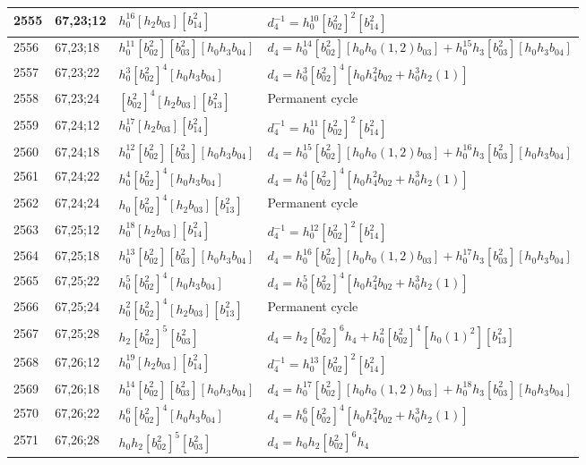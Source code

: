 \documentclass{article}
\begin{document}
\begin{longtable}{|l|l|>{\raggedright\arraybackslash}p{6cm}|>{\raggedright\arraybackslash}p{6cm}|}
\hline
2555 & 67,23;12 & $h_0^{16}[h_2b_{03}][b_{14}^2]$ & $d_{4}^{-1}=h_0^{10}[b_{02}^2]^2[b_{14}^2]$\\
\hline
2556 & 67,23;18 & $h_0^{11}[b_{02}^2][b_{03}^2][h_0h_3b_{04}]$ &$d_{4}=h_0^{14}[b_{02}^2][h_0h_0(1, 2)b_{03}] + h_0^{15}h_3[b_{03}^2][h_0h_3b_{04}]$\\
\hline
2557 & 67,23;22 & $h_0^3[b_{02}^2]^4[h_0h_3b_{04}]$ &$d_{4}=h_0^3[b_{02}^2]^4[h_0h_4^2b_{02} + h_0^3h_2(1)]$\\
\hline
2558 & 67,23;24 & $[b_{02}^2]^4[h_2b_{03}][b_{13}^2]$ & Permanent cycle\\
\hline
2559 & 67,24;12 & $h_0^{17}[h_2b_{03}][b_{14}^2]$ & $d_{4}^{-1}=h_0^{11}[b_{02}^2]^2[b_{14}^2]$\\
\hline
2560 & 67,24;18 & $h_0^{12}[b_{02}^2][b_{03}^2][h_0h_3b_{04}]$ &$d_{4}=h_0^{15}[b_{02}^2][h_0h_0(1, 2)b_{03}] + h_0^{16}h_3[b_{03}^2][h_0h_3b_{04}]$\\
\hline
2561 & 67,24;22 & $h_0^4[b_{02}^2]^4[h_0h_3b_{04}]$ &$d_{4}=h_0^4[b_{02}^2]^4[h_0h_4^2b_{02} + h_0^3h_2(1)]$\\
\hline
2562 & 67,24;24 & $h_0[b_{02}^2]^4[h_2b_{03}][b_{13}^2]$ & Permanent cycle\\
\hline
2563 & 67,25;12 & $h_0^{18}[h_2b_{03}][b_{14}^2]$ & $d_{4}^{-1}=h_0^{12}[b_{02}^2]^2[b_{14}^2]$\\
\hline
2564 & 67,25;18 & $h_0^{13}[b_{02}^2][b_{03}^2][h_0h_3b_{04}]$ &$d_{4}=h_0^{16}[b_{02}^2][h_0h_0(1, 2)b_{03}] + h_0^{17}h_3[b_{03}^2][h_0h_3b_{04}]$\\
\hline
2565 & 67,25;22 & $h_0^5[b_{02}^2]^4[h_0h_3b_{04}]$ &$d_{4}=h_0^5[b_{02}^2]^4[h_0h_4^2b_{02} + h_0^3h_2(1)]$\\
\hline
2566 & 67,25;24 & $h_0^2[b_{02}^2]^4[h_2b_{03}][b_{13}^2]$ & Permanent cycle\\
\hline
2567 & 67,25;28 & $h_2[b_{02}^2]^5[b_{03}^2]$ &$d_{4}=h_2[b_{02}^2]^6h_4 + h_0^2[b_{02}^2]^4[h_0(1)^2][b_{13}^2]$\\
\hline
2568 & 67,26;12 & $h_0^{19}[h_2b_{03}][b_{14}^2]$ & $d_{4}^{-1}=h_0^{13}[b_{02}^2]^2[b_{14}^2]$\\
\hline
2569 & 67,26;18 & $h_0^{14}[b_{02}^2][b_{03}^2][h_0h_3b_{04}]$ &$d_{4}=h_0^{17}[b_{02}^2][h_0h_0(1, 2)b_{03}] + h_0^{18}h_3[b_{03}^2][h_0h_3b_{04}]$\\
\hline
2570 & 67,26;22 & $h_0^6[b_{02}^2]^4[h_0h_3b_{04}]$ &$d_{4}=h_0^6[b_{02}^2]^4[h_0h_4^2b_{02} + h_0^3h_2(1)]$\\
\hline
2571 & 67,26;28 & $h_0h_2[b_{02}^2]^5[b_{03}^2]$ &$d_{4}=h_0h_2[b_{02}^2]^6h_4$\\

\end{longtable}
\end{document}

